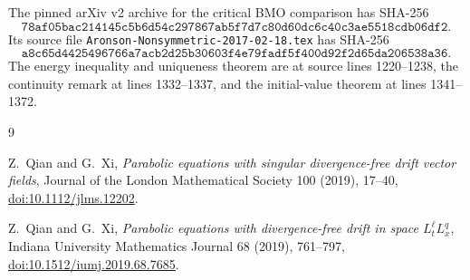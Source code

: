 \documentclass[11pt]{article}
\theoremstyle{remark}
\begin{document}
The pinned arXiv v2 archive for the critical BMO comparison has
SHA-256
\[
\texttt{78af05bac214145c5b6d54c297867ab5f7d7c80d60dc6c40c3ae5518cdb06df2}.
\]
Its source file
\texttt{Aronson-Nonsymmetric-2017-02-18.tex} has SHA-256
\[
\texttt{a8c65d4425496766a7acb2d25b30603f4e79fadf5f400d92f2d65da206538a36}.
\]
The energy inequality and uniqueness theorem are at source lines
1220--1238, the continuity remark at lines 1332--1337, and the
initial-value theorem at lines 1341--1372.

\begin{thebibliography}{9}
\raggedright

Z.~Qian and G.~Xi,
\emph{Parabolic equations with singular divergence-free drift vector
fields},
Journal of the London Mathematical Society 100 (2019), 17--40,
\href{https://doi.org/10.1112/jlms.12202}
{doi:10.1112/jlms.12202}.

Z.~Qian and G.~Xi,
\emph{Parabolic equations with divergence-free drift in space
\(L_t^\ell L_x^q\)},
Indiana University Mathematics Journal 68 (2019), 761--797,
\href{https://doi.org/10.1512/iumj.2019.68.7685}
{doi:10.1512/iumj.2019.68.7685}.

\end{thebibliography}
\end{document}
